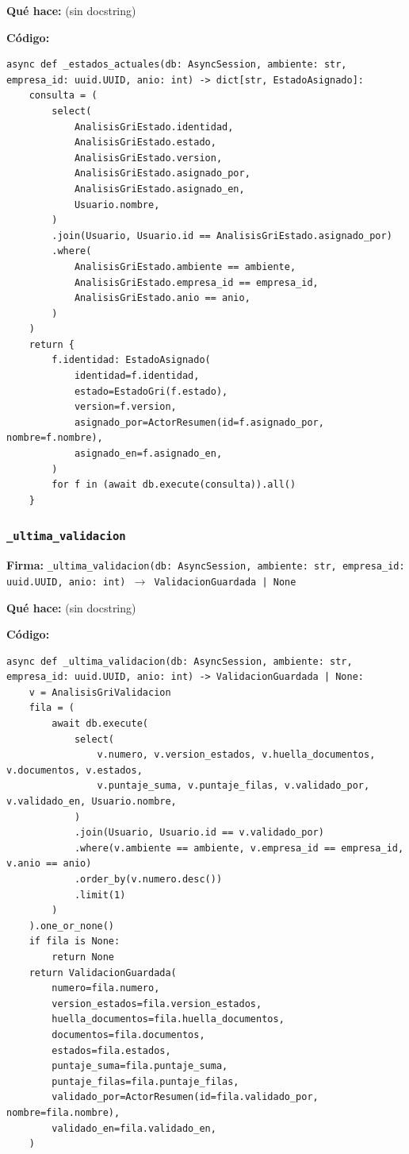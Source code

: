 \documentclass[11pt,a4paper]{article}
\begin{document}
\textbf{Qué hace:} (sin docstring)

\textbf{Código:}
\begin{lstlisting}
async def _estados_actuales(db: AsyncSession, ambiente: str, empresa_id: uuid.UUID, anio: int) -> dict[str, EstadoAsignado]:
    consulta = (
        select(
            AnalisisGriEstado.identidad,
            AnalisisGriEstado.estado,
            AnalisisGriEstado.version,
            AnalisisGriEstado.asignado_por,
            AnalisisGriEstado.asignado_en,
            Usuario.nombre,
        )
        .join(Usuario, Usuario.id == AnalisisGriEstado.asignado_por)
        .where(
            AnalisisGriEstado.ambiente == ambiente,
            AnalisisGriEstado.empresa_id == empresa_id,
            AnalisisGriEstado.anio == anio,
        )
    )
    return {
        f.identidad: EstadoAsignado(
            identidad=f.identidad,
            estado=EstadoGri(f.estado),
            version=f.version,
            asignado_por=ActorResumen(id=f.asignado_por, nombre=f.nombre),
            asignado_en=f.asignado_en,
        )
        for f in (await db.execute(consulta)).all()
    }
\end{lstlisting}

\subsubsection*{\texttt{\_ultima\_validacion}}
\textbf{Firma:} \texttt{\_ultima\_validacion(db: AsyncSession, ambiente: str, empresa\_id: uuid.UUID, anio: int) $\rightarrow$ ValidacionGuardada | None}

\textbf{Qué hace:} (sin docstring)

\textbf{Código:}
\begin{lstlisting}
async def _ultima_validacion(db: AsyncSession, ambiente: str, empresa_id: uuid.UUID, anio: int) -> ValidacionGuardada | None:
    v = AnalisisGriValidacion
    fila = (
        await db.execute(
            select(
                v.numero, v.version_estados, v.huella_documentos, v.documentos, v.estados,
                v.puntaje_suma, v.puntaje_filas, v.validado_por, v.validado_en, Usuario.nombre,
            )
            .join(Usuario, Usuario.id == v.validado_por)
            .where(v.ambiente == ambiente, v.empresa_id == empresa_id, v.anio == anio)
            .order_by(v.numero.desc())
            .limit(1)
        )
    ).one_or_none()
    if fila is None:
        return None
    return ValidacionGuardada(
        numero=fila.numero,
        version_estados=fila.version_estados,
        huella_documentos=fila.huella_documentos,
        documentos=fila.documentos,
        estados=fila.estados,
        puntaje_suma=fila.puntaje_suma,
        puntaje_filas=fila.puntaje_filas,
        validado_por=ActorResumen(id=fila.validado_por, nombre=fila.nombre),
        validado_en=fila.validado_en,
    )
\end{lstlisting}
\end{document}
